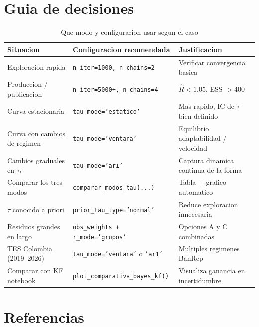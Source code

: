 \documentclass[12pt, a4paper]{article}
\theoremstyle{plain}
\theoremstyle{definition}
\theoremstyle{remark}
\begin{document}
\section{Guia de decisiones}

\begin{table}[H]
\centering
\caption{Que modo y configuracion usar segun el caso}
\small
\begin{tabular}{L{4cm} L{5.5cm} L{4.5cm}}
\toprule
\textbf{Situacion} & \textbf{Configuracion recomendada} & \textbf{Justificacion} \\
\midrule
Exploracion rapida
  & \texttt{n\_iter=1000, n\_chains=2}
  & Verificar convergencia basica \\
\addlinespace
Produccion / publicacion
  & \texttt{n\_iter=5000+, n\_chains=4}
  & $\hat{R} < 1.05$, ESS $> 400$ \\
\addlinespace
Curva estacionaria
  & \texttt{tau\_mode='estatico'}
  & Mas rapido, IC de $\tau$ bien definido \\
\addlinespace
Curva con cambios de regimen
  & \texttt{tau\_mode='ventana'}
  & Equilibrio adaptabilidad / velocidad \\
\addlinespace
Cambios graduales en $\tau_t$
  & \texttt{tau\_mode='ar1'}
  & Captura dinamica continua de la forma \\
\addlinespace
Comparar los tres modos
  & \texttt{comparar\_modos\_tau(...)}
  & Tabla + grafico automatico \\
\addlinespace
$\tau$ conocido a priori
  & \texttt{prior\_tau\_type='normal'}
  & Reduce exploracion innecesaria \\
\addlinespace
Residuos grandes en largo
  & \texttt{obs\_weights + r\_mode='grupos'}
  & Opciones A y C combinadas \\
\addlinespace
TES Colombia (2019--2026)
  & \texttt{tau\_mode='ventana'} o \texttt{'ar1'}
  & Multiples regimenes BanRep \\
\addlinespace
Comparar con KF notebook
  & \texttt{plot\_comparativa\_bayes\_kf()}
  & Visualiza ganancia en incertidumbre \\
\bottomrule
\end{tabular}
\end{table}

\section*{Referencias}
\end{document}
